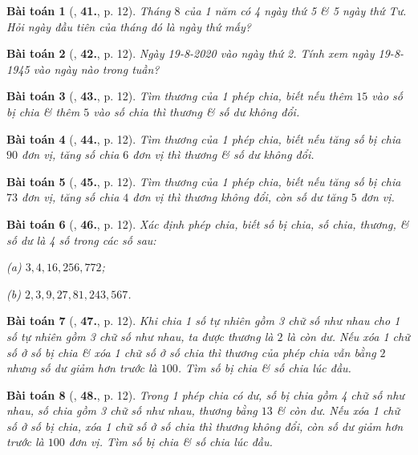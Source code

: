 \documentclass{article}
\numberwithin{equation}{section}
\newtheorem{baitoan}{Bài toán}
\begin{document}
\begin{baitoan}[\cite{Binh_Toan_6_tap_1}, \textbf{41.}, p. 12]
	Tháng $8$ của 1 năm có 4 ngày thứ 5 \& 5 ngày thứ Tư. Hỏi ngày đầu tiên của tháng đó là ngày thứ mấy?
\end{baitoan}

\begin{baitoan}[\cite{Binh_Toan_6_tap_1}, \textbf{42.}, p. 12]
	Ngày 19-8-2020 vào ngày thứ 2. Tính xem ngày 19-8-1945 vào ngày nào trong tuần?
\end{baitoan}

\begin{baitoan}[\cite{Binh_Toan_6_tap_1}, \textbf{43.}, p. 12]
	Tìm thương của 1 phép chia, biết nếu thêm $15$ vào số bị chia \& thêm $5$ vào số chia thì thương \& số dư không đổi.
\end{baitoan}

\begin{baitoan}[\cite{Binh_Toan_6_tap_1}, \textbf{44.}, p. 12]
	Tìm thương của 1 phép chia, biết nếu tăng số bị chia $90$ đơn vị, tăng số chia $6$ đơn vị thì thương \& số dư không đổi.
\end{baitoan}

\begin{baitoan}[\cite{Binh_Toan_6_tap_1}, \textbf{45.}, p. 12]
	Tìm thương của 1 phép chia, biết nếu tăng số bị chia $73$ đơn vị, tăng số chia $4$ đơn vị thì thương không đổi, còn số dư tăng $5$ đơn vị.
\end{baitoan}

\begin{baitoan}[\cite{Binh_Toan_6_tap_1}, \textbf{46.}, p. 12]
	Xác định phép chia, biết số bị chia, số chia, thương, \& số dư là 4 số trong các số sau:
	\begin{enumerate*}
		\item[(a)] $3,4,16,256,772$;
		\item[(b)] $2,3,9,27,81,243,567$.
	\end{enumerate*}
\end{baitoan}

\begin{baitoan}[\cite{Binh_Toan_6_tap_1}, \textbf{47.}, p. 12]
	Khi chia 1 số tự nhiên gồm 3 chữ số như nhau cho 1 số tự nhiên gồm 3 chữ số như nhau, ta được thương là $2$ là còn dư. Nếu xóa 1 chữ số ở số bị chia \& xóa 1 chữ số ở số chia thì thương của phép chia vẫn bằng $2$ nhưng số dư giảm hơn trước là $100$. Tìm số bị chia \& số chia lúc đầu.
\end{baitoan}

\begin{baitoan}[\cite{Binh_Toan_6_tap_1}, \textbf{48.}, p. 12]
	Trong 1 phép chia có dư, số bị chia gồm 4 chữ số như nhau, số chia gồm 3 chữ số như nhau, thương bằng $13$ \& còn dư. Nếu xóa 1 chữ số ở số bị chia, xóa 1 chữ số ở số chia thì thương không đổi, còn số dư giảm hơn trước là $100$ đơn vị. Tìm số bị chia \& số chia lúc đầu.
\end{baitoan}
\end{document}
